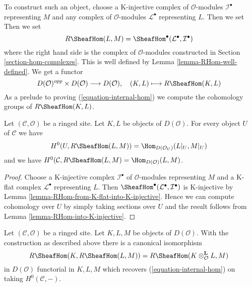 \medskip\noindent
To construct such an object, choose a K-injective complex of
$\mathcal{O}$-modules $\mathcal{I}^\bullet$ representing $M$ and any
complex of $\mathcal{O}$-modules $\mathcal{L}^\bullet$ representing $L$.
Then we set
Then we set
$$
R\SheafHom(L, M) = \SheafHom^\bullet(\mathcal{L}^\bullet, \mathcal{I}^\bullet)
$$
where the right hand side is the complex of $\mathcal{O}$-modules
constructed in Section \ref{section-hom-complexes}.
This is well defined by Lemma \ref{lemma-RHom-well-defined}.
We get a functor
$$
D(\mathcal{O})^{opp} \times D(\mathcal{O}) \longrightarrow D(\mathcal{O}),
\quad
(K, L) \longmapsto R\SheafHom(K, L)
$$
As a prelude to proving (\ref{equation-internal-hom})
we compute the cohomology groups of $R\SheafHom(K, L)$.

\begin{lemma}
\label{lemma-section-RHom-over-U}
Let $(\mathcal{C}, \mathcal{O})$ be a ringed site. Let $K, L$ be objects
of $D(\mathcal{O})$. For every object $U$ of $\mathcal{C}$ we have
$$
H^0(U, R\SheafHom(L, M)) =
\Hom_{D(\mathcal{O}_U)}(L|_U, M|_U)
$$
and we have $H^0(\mathcal{C}, R\SheafHom(L, M) =
\Hom_{D(\mathcal{O})}(L, M)$.
\end{lemma}

\begin{proof}
Choose a K-injective complex $\mathcal{I}^\bullet$ of
$\mathcal{O}$-modules representing $M$ and a K-flat complex
$\mathcal{L}^\bullet$ representing $L$. Then
$\SheafHom^\bullet(\mathcal{L}^\bullet, \mathcal{I}^\bullet)$
is K-injective by Lemma \ref{lemma-RHom-from-K-flat-into-K-injective}.
Hence we can compute cohomology over $U$ by simply taking sections over $U$
and the result follows from Lemma \ref{lemma-RHom-into-K-injective}.
\end{proof}

\begin{lemma}
\label{lemma-internal-hom}
Let $(\mathcal{C}, \mathcal{O})$ be a ringed site. Let $K, L, M$ be objects
of $D(\mathcal{O})$. With the construction as described above
there is a canonical isomorphism
$$
R\SheafHom(K, R\SheafHom(L, M)) =
R\SheafHom(K \otimes_\mathcal{O}^\mathbf{L} L, M)
$$
in $D(\mathcal{O})$ functorial in $K, L, M$
which recovers (\ref{equation-internal-hom}) on taking $H^0(\mathcal{C}, -)$.
\end{lemma}

